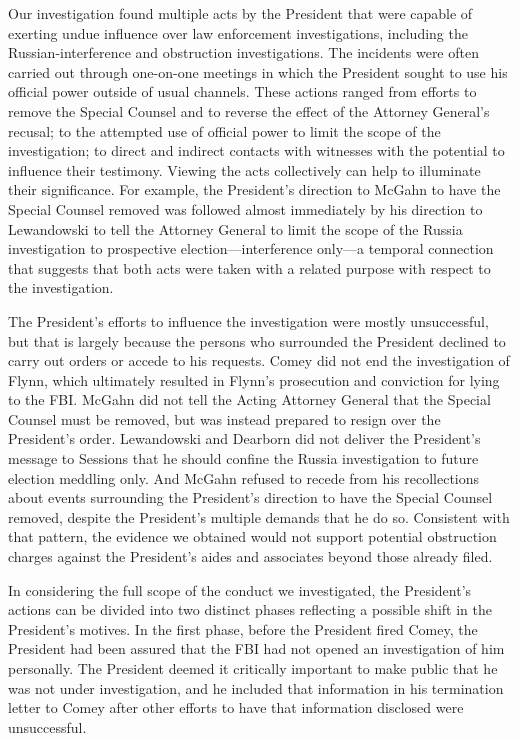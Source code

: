 Our investigation found multiple acts by the President that were capable of exerting undue influence over law enforcement investigations, including the Russian-interference and obstruction investigations.
The incidents were often carried out through one-on-one meetings in which the President sought to use his official power outside of usual channels.
These actions ranged from efforts to remove the Special Counsel and to reverse the effect of the Attorney General's recusal; to the attempted use of official power to limit the scope of the investigation; to direct and indirect contacts with witnesses with the potential to influence their testimony.
Viewing the acts collectively can help to illuminate their significance.
For example, the President's direction to McGahn to have the Special Counsel removed was followed almost immediately by his direction to Lewandowski to tell the Attorney General to limit the scope of the Russia investigation to prospective election---interference only---a temporal connection that suggests that both acts were taken with a related purpose with respect to the investigation.

The President's efforts to influence the investigation were mostly unsuccessful, but that is largely because the persons who surrounded the President declined to carry out orders or accede to his requests.
Comey did not end the investigation of Flynn, which ultimately resulted in Flynn's prosecution and conviction for lying to the FBI\null.
McGahn did not tell the Acting Attorney General that the Special Counsel must be removed, but was instead prepared to resign over the President's order.
Lewandowski and Dearborn did not deliver the President's message to Sessions that he should confine the Russia investigation to future election meddling only.
And McGahn refused to recede from his recollections about events surrounding the President's direction to have the Special Counsel removed, despite the President's multiple demands that he do so.
Consistent with that pattern, the evidence we obtained would not support potential obstruction charges against the President's aides and associates beyond those already filed.

In considering the full scope of the conduct we investigated, the President's actions can be divided into two distinct phases reflecting a possible shift in the President's motives.
In the first phase, before the President fired Comey, the President had been assured that the FBI had not opened an investigation of him personally.
The President deemed it critically important to make public that he was not under investigation, and he included that information in his termination letter to Comey after other efforts to have that information disclosed were unsuccessful.

